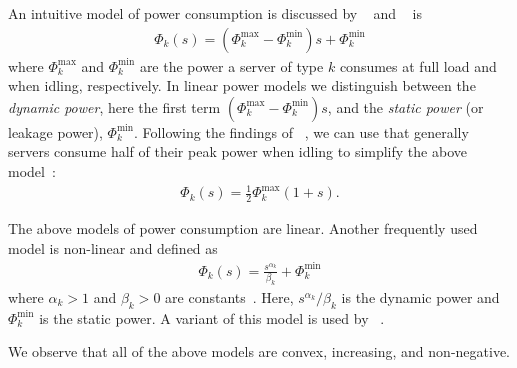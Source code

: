 An intuitive model of power consumption is discussed by \citeauthor*{Dayarathna2016}~\cite{Dayarathna2016} and \citeauthor*{Ismail2020}~\cite{Ismail2020} is \begin{align*}
    \Phi_k(s) = (\Phi_k^{\text{max}} - \Phi_k^{\text{min}})s + \Phi_k^{\text{min}}
\end{align*} where $\Phi_k^{\text{max}}$ and $\Phi_k^{\text{min}}$ are the power a server of type $k$ consumes at full load and when idling, respectively. In linear power models we distinguish between the \emph{dynamic power}, here the first term $(\Phi_k^{\text{max}} - \Phi_k^{\text{min}})s$, and the \emph{static power} (or leakage power), $\Phi_k^{\text{min}}$. Following the findings of \citeauthor*{Barroso2007}~\cite{Barroso2007}, we can use that generally servers consume half of their peak power when idling to simplify the above model~\cite{Ismail2020}: \begin{align*}
    \Phi_k(s) = \frac{1}{2} \Phi_k^{\text{max}} (1 + s).
\end{align*}

The above models of power consumption are linear. Another frequently used model is non-linear and defined as \begin{align*}
    \Phi_k(s) = \frac{s^{\alpha_k}}{\beta_k} + \Phi_k^{\text{min}}
\end{align*} where $\alpha_k > 1$ and $\beta_k > 0$ are constants~\cite{Dayarathna2016}. Here, $s^{\alpha_k}/\beta_k$ is the dynamic power and $\Phi_k^{\text{min}}$ is the static power. A variant of this model is used by \citeauthor*{Bansal2015}~\cite{Bansal2015}.

We observe that all of the above models are convex, increasing, and non-negative.

